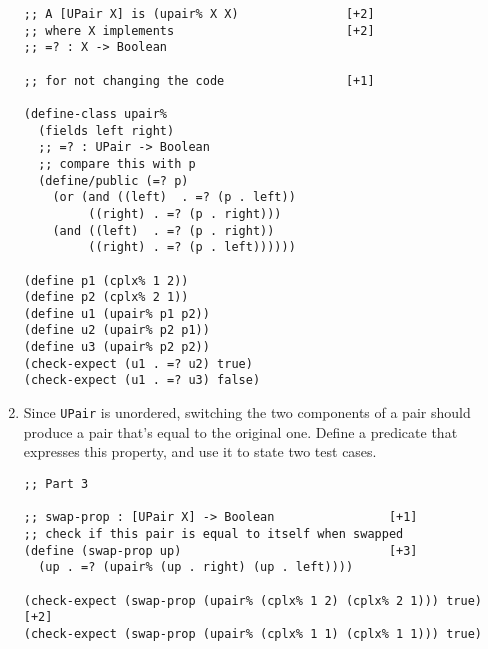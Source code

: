 \documentclass[12pt]{article}                   %
\newenvironment{solution}{}{}
\begin{document}
\begin{problem}
\begin{enumerate}
\begin{solution}
\begin{verbatim}
;; A [UPair X] is (upair% X X)               [+2]
;; where X implements                        [+2]
;; =? : X -> Boolean

;; for not changing the code                 [+1]

(define-class upair%
  (fields left right)
  ;; =? : UPair -> Boolean
  ;; compare this with p
  (define/public (=? p)
    (or (and ((left)  . =? (p . left))
	     ((right) . =? (p . right)))
	(and ((left)  . =? (p . right))
	     ((right) . =? (p . left))))))

(define p1 (cplx% 1 2))
(define p2 (cplx% 2 1))
(define u1 (upair% p1 p2))
(define u2 (upair% p2 p1))
(define u3 (upair% p2 p2))
(check-expect (u1 . =? u2) true)
(check-expect (u1 . =? u3) false)
\end{verbatim}
\end{solution}

\newpage
\item Since {\tt UPair} is unordered, switching the two components of
  a pair should produce a pair that's equal to the original one.
  Define a predicate that expresses this property, and use it to state
  two test cases.

\begin{solution}
\begin{verbatim}
;; Part 3

;; swap-prop : [UPair X] -> Boolean                [+1]
;; check if this pair is equal to itself when swapped
(define (swap-prop up)                             [+3]
  (up . =? (upair% (up . right) (up . left))))

(check-expect (swap-prop (upair% (cplx% 1 2) (cplx% 2 1))) true) [+2]
(check-expect (swap-prop (upair% (cplx% 1 1) (cplx% 1 1))) true)

\end{verbatim}
\end{solution}

\end{enumerate}
\end{problem}
\end{document}
